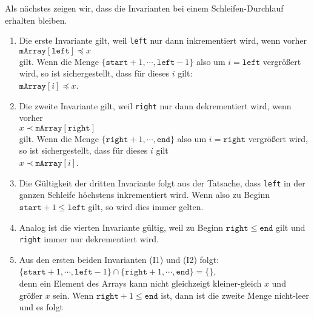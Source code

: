 \noindent
Als n\"achstes zeigen wir, dass die Invarianten bei einem Schleifen-Durchlauf erhalten
bleiben.  
\begin{enumerate}
\item Die erste Invariante gilt, weil \texttt{left} nur dann inkrementiert wird,
      wenn vorher \\[0.1cm]
      \hspace*{1.3cm} $\texttt{mArray}[\texttt{left}] \preceq x$ \\[0.1cm]
      gilt.  Wenn die Menge $\{\mathtt{start}+1, \cdots, \mathtt{left}-1\}$ also um 
      $i = \mathtt{left}$ vergr\"o{\ss}ert wird, so ist sichergestellt, dass f\"ur dieses $i$ gilt:
      \\[0.1cm]
      \hspace*{1.3cm} $\texttt{mArray}[i] \preceq x$.
\item Die zweite Invariante gilt, weil \texttt{right} nur dann dekrementiert wird,
      wenn vorher \\[0.1cm]
      \hspace*{1.3cm} $x \prec \texttt{mArray}[\texttt{right}]$ \\[0.1cm]
      gilt.  Wenn die Menge $\{\mathtt{right}+1, \cdots, \mathtt{end}\}$ also um 
      $i = \mathtt{right}$ vergr\"o{\ss}ert wird, so ist sichergestellt, dass f\"ur dieses $i$ gilt
      \\[0.1cm]
      \hspace*{1.3cm} $x \prec \texttt{mArray}[i]$.
\item Die G\"ultigkeit der dritten Invariante folgt aus der Tatsache, dass \texttt{left}
      in der ganzen Schleife h\"ochstens inkrementiert wird.  Wenn also zu Beginn 
      $\mathtt{start} + 1 \leq \mathtt{left}$ gilt, so wird dies immer gelten.  
\item Analog ist die vierten Invariante g\"ultig, weil zu Beginn $\mathtt{right} \leq \mathtt{end}$ gilt und
      \texttt{right} immer nur dekrementiert wird.
\item Aus den ersten beiden Invarianten (I1) und (I2) folgt: \\[0.1cm]
      \hspace*{1.3cm} 
      $\{ \mathtt{start}+1, \cdots, \mathtt{left} - 1 \} \cap \{ \mathtt{right}+1, \cdots, \mathtt{end} \} = \{\}$,
      \\[0.1cm]
      denn ein Element des Arrays kann nicht gleichzeigt kleiner-gleich $x$ und 
      gr\"o{\ss}er $x$ sein.
      Wenn $\texttt{right} + 1 \leq \texttt{end}$ ist, dann ist die zweite Menge
      nicht-leer und es folgt \\[0.1cm]

\end{enumerate}
